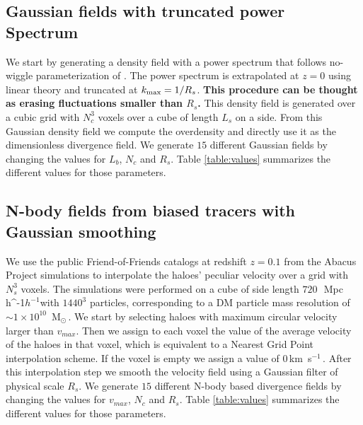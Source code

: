 \documentclass[usenatbib]{mnras}
\newcommand{\Msun}{\,{\rm M}$_{\odot}$\,}
\newcommand{\Mpch}{\,{\rm Mpc}\,\ifmmode h^{-1}\else $h^{-1}$\fi}
\newcommand{\kms}{\,{\rm km}\ s$^{-1}$\,}
\begin{document}
\subsection{Gaussian fields with truncated power Spectrum}

We start by generating a density field with a power spectrum that follows no-wiggle parameterization of \cite{1998ApJ...496..605E}.
The power spectrum is extrapolated at $z=0$ using linear theory and truncated at $k_{\rm max}=1/R_s$.
\textbf{This procedure can be thought as erasing fluctuations smaller than $R_s$.}
This density field is generated over a cubic grid with $N_c^3$ voxels over a cube of length $L_s$ on a side.
From this Gaussian density field we compute  the overdensity and directly use it as the dimensionless divergence field.
We generate $15$ different Gaussian fields by changing the values for $L_b$, $N_c$ and $R_s$. 
Table \ref{table:values} summarizes the different values for those parameters.

\subsection{N-body fields from biased tracers with Gaussian smoothing}

We use the public Friend-of-Friends catalogs at redshift $z=0.1$
from the Abacus Project simulations \citep{2018ApJS..236...43G} to interpolate the haloes' peculiar velocity over a grid with $N_s^3$ voxels.
The simulations were performed on a cube of side length $720$\ \Mpch with
$1440^3$ particles, corresponding to a DM particle mass resolution of $\sim 1 \times 10^{10}$ \Msun.
We start by selecting haloes with maximum circular velocity larger
than $v_{max}$.
Then we assign to each voxel the value of the average velocity of the haloes in that voxel, which is equivalent to a Nearest Grid Point interpolation scheme. 
If the voxel is empty we assign a value of $0$\kms.
After this interpolation step we smooth the velocity field using a Gaussian filter of physical scale $R_s$.
We generate $15$ different N-body based divergence fields by changing the values for $v_{max}$, $N_c$ and $R_s$. 
Table \ref{table:values} summarizes the different values for those parameters.
\end{document}
